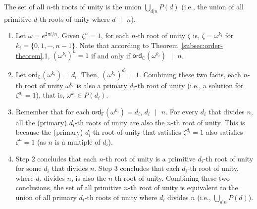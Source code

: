 \begin{tcolorbox}[title={\textbf{\tboxtheorem{\ref*{subsec:roots-theorem}.3} Set of All $\bm{n}$-th Roots of Unity}}]
The set of all $n$-th roots of unity is the union $\bigcup_{d|n} P(d)$ (i.e., the union of all primitive $d$-th roots of unity where $d \text{ } | \text{ } n$).
\end{tcolorbox}
\begin{myproof}
    \begin{enumerate}
    \item Let $\omega = e^{2\pi i/n}$.
    Given $\zeta^n = 1$, for each $n$-th root of unity $\zeta$ is, $\zeta = \omega^{k_i}$ for $k_i = \{0, 1, \cdots, n-1\}$. Note that according to Theorem~\ref*{subsec:order-theorem}.1, $(\omega^{k_i})^n = 1$ if and only if $\textsf{ord}_\mathbb{C}(\omega^{k_i}) \text{ } | \text{ } n$. 
    \item Let $\textsf{ord}_\mathbb{C}(\omega^{k_i}) = d_i$. Then, $(\omega^{k_i})^{d_i} = 1$. Combining these two facts, each $n$-th root of unity $\omega^{k_i}$ is also a primary $d_i$-th root of unity (i.e., a solution for $\zeta^{d_i} = 1$), that is, $\omega^{k_i} \in P(d_i)$. 
    \item Remember that for each $\textsf{ord}_\mathbb{F}(\omega^{k_i}) = d_i$, $d_i \text{ } | \text{ } n$. For every $d_i$ that divides $n$, all the (primary) $d_i$-th roots of unity are also the $n$-th root of unity. This is because the (primary) $d_i$-th root of unity that satisfies $\zeta^{d_i} = 1$ also satisfies $\zeta^{n} = 1$ (as $n$ is a multiple of $d_i$).
    \item Step 2 concludes that each $n$-th root of unity is a primitive $d_i$-th root of unity for some $d_i$ that divides $n$. Step 3 concludes that each $d_i$-th root of unity, where $d_i$ divides $n$, is also the $n$-th root of unity. Combining these two conclusions, the set of all primitive $n$-th root of unity is equivalent to the union of all primary $d_i$-th roots of unity where $d_i$ divides $n$ (i.e., $\bigcup_{d|n} P(d)$). 
    \end{enumerate}
\end{myproof}

